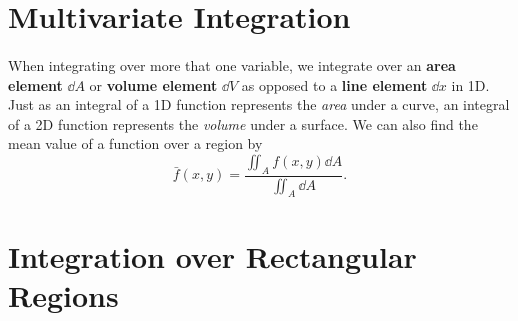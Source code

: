 \documentclass[../multivariate_calculus.tex]{subfiles}
\begin{document}
    \section{Multivariate Integration}
        \paragraph{}
        When integrating over more that one variable, we integrate over an \textbf{area element} $\dd{A}$ or \textbf{volume element} $\dd{V}$ as opposed to a \textbf{line element} $\dd{x}$ in 1D.
        Just as an integral of a 1D function represents the \textit{area} under a curve, an integral of a 2D function represents the \textit{volume} under a surface.
        We can also find the mean value of a function over a region by
        \begin{equation}
            \bar{f}(x,y)=\frac{\iint_A f(x,y)\dd{A}}{\iint_A\dd{A}}.
        \end{equation}

    \section{Integration over Rectangular Regions}
\end{document}

